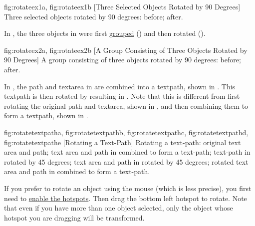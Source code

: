 {
 {fig:rotateex1a}{}{},
 {fig:rotateex1b}{}{}
}
[Three Selected Objects Rotated by 90 Degrees]
{Three selected objects rotated by 90 degrees: 
 before;
 after.}

In , the three objects in
 were first \hyperref[sec:grouping]{grouped}
() and then rotated 
().

{
 {fig:rotateex2a}{}{},
 {fig:rotateex2b}{}{}
}
[A Group Consisting of Three Objects Rotated by 90 Degrees]
{A group consisting of three objects rotated by 90 degrees:
 before;  after.}

In , the \gls*{path} and
\gls*{textarea} in  are
combined into a \gls*{textpath}, shown in
. This \gls*{textpath} is then
rotated by  resulting in
. Note that this is different
from first rotating the original \gls*{path} and \gls*{textarea},
shown in , and then combining
them to form a \gls*{textpath}, shown in
.

{
 {fig:rotatetextpatha}{}{},
 {fig:rotatetextpathb}{}{},
 {fig:rotatetextpathc}{}{},
 {fig:rotatetextpathd}{}{},
 {fig:rotatetextpathe}{}{}
}
[Rotating a Text-Path]
{Rotating a text-path: 
 original text area and path; 
 text area and path in
 combined to form a text-path;
 text-path in
 rotated by 45 degrees;
 text area and path in
 rotated by 45 degrees;
 rotated text area and
path in  combined to form a text-path.}

If you prefer to rotate an \gls{object} using the mouse (which is
less precise), you first need to \hyperref[mi:hotspots]{enable the hotspots}.
Then drag the bottom left hotspot to rotate. Note that even if you
have more than one object selected, only the object whose hotspot you
are dragging will be transformed.


